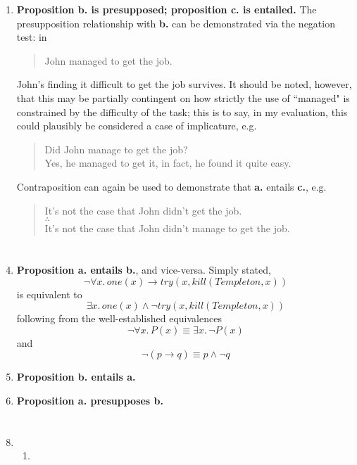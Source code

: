 \documentclass[12pt,a4paper]{article}
\begin{document}
\begin{enumerate}
\item \textbf{Proposition b. is presupposed; proposition c. is entailed.} The presupposition relationship with \textbf{b.} can be demonstrated via the negation test: in
\begin{quote}
John managed to get the job.
\end{quote}
John's finding it difficult to get the job survives. It should be noted, however, that this may be partially contingent on how strictly the use of ``managed" is constrained by the difficulty of the task; this is to say, in my evaluation, this could plausibly be considered a case of implicature, e.g.
\begin{quote}
Did John manage to get the job?\\
Yes, he managed to get it, in fact, he found it quite easy.
\end{quote}
Contraposition can again be used to demonstrate that \textbf{a.} entails \textbf{c.}, e.g.
\begin{quote}
It's not the case that John didn't get the job.\\
$\therefore$\\
It's not the case that John didn't manage to get the job.
\end{quote}

\end{enumerate}


\part{}
\begin{enumerate}
\setcounter{enumi}{3}
\item \textbf{Proposition a. entails b.}, and vice-versa. Simply stated,
\[
\neg \forall x.\, one(x) \rightarrow try(x, kill(Templeton, x))
\]
is equivalent to
\[
\exists x.\, one(x) \wedge \neg try(x, kill(Templeton, x))
\]
following from the well-established equivalences
\[
\neg \forall x.\, P(x) \equiv \exists x.\, \neg P(x)
\]
and
\[
\neg (p \rightarrow q) \equiv p \wedge \neg q
\]

\item \textbf{Proposition b. entails a.}

\item \textbf{Proposition a. presupposes b.}
\end{enumerate}


\part{}
\begin{enumerate}
\setcounter{enumi}{7}
\item 
\begin{enumerate}

\item 

\end{enumerate}
\end{enumerate}
\end{document}
